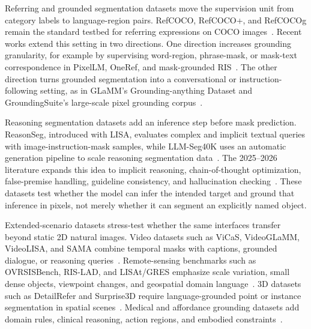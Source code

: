 Referring and grounded segmentation datasets move the supervision unit from category labels to language-region pairs. RefCOCO, RefCOCO+, and RefCOCOg remain the standard testbed for referring expressions on COCO images~\citep{kazemzadeh2014referitgame,yu2016modeling,mao2016generation}. Recent works extend this setting in two directions. One direction increases grounding granularity, for example by supervising word-region, phrase-mask, or mask-text correspondence in PixelLM, OneRef, and mask-grounded RIS~\citep{xuPixelalignedLanguageModel2024,xiaoOnerefUnifiedOnetower2024,chngMaskGroundingReferring2024}. The other direction turns grounded segmentation into a conversational or instruction-following setting, as in GLaMM's Grounding-anything Dataset and GroundingSuite's large-scale pixel grounding corpus~\citep{rasheedGlammPixelGrounding2024,huGroundingSuiteMeasuringComplex2025}.

Reasoning segmentation datasets add an inference step before mask prediction. ReasonSeg, introduced with LISA, evaluates complex and implicit textual queries with image-instruction-mask samples, while LLM-Seg40K uses an automatic generation pipeline to scale reasoning segmentation data~\citep{xlaiLisaReasoningSegmentation2024,jwangLlmsegBridgingImage2024}. The 2025--2026 literature expands this idea to implicit reasoning, chain-of-thought optimization, false-premise handling, guideline consistency, and hallucination checking~\citep{zhouReasoningImplicitSelfsupervised2026,zhuLensLearningSegment2026,vvatsGuidelineConsistentSegmentationMultiAgent2026,guoSeeingBelievingRichContext2026}. These datasets test whether the model can infer the intended target and ground that inference in pixels, not merely whether it can segment an explicitly named object.

Extended-scenario datasets stress-test whether the same interfaces transfer beyond static 2D natural images. Video datasets such as ViCaS, VideoGLaMM, VideoLISA, and SAMA combine temporal masks with captions, grounded dialogue, or reasoning queries~\citep{atharVicasDatasetCombining2025,munasingheVideoglammLargeMultimodal2025,baiOneTokenSeg2024,sunSamaMultiturnReferential2026}. Remote-sensing benchmarks such as OVRSISBench, RIS-LAD, and LISAt/GRES emphasize scale variation, small dense objects, viewpoint changes, and geospatial domain language~\citep{libExploringEfficientOpenvocabulary2026,yeRISLADBenchmarkModel2026,quenumLisatLanguageinstructedSegmentation2026}. 3D datasets such as DetailRefer and Surprise3D require language-grounded point or instance segmentation in spatial scenes~\citep{chen3DDRESDetailed3D2026,huangSurprise3dDatasetSpatial2026}. Medical and affordance grounding datasets add domain rules, clinical reasoning, action regions, and embodied constraints~\citep{yanMedreasonerReinforcementLearning2026,wangAffordancer1ReinforcementLearning2026}.

